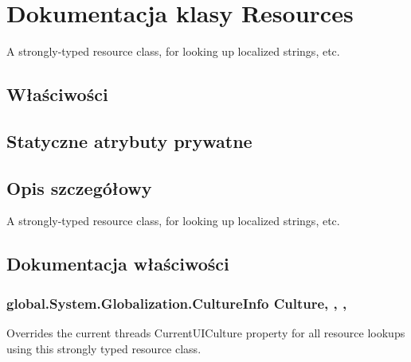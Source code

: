 \hypertarget{a00047}{}\section{Dokumentacja klasy Resources}
\label{a00047}


A strongly-\/typed resource class, for looking up localized strings, etc.  


\subsection*{Właściwości}
\subsection*{Statyczne atrybuty prywatne}


\subsection{Opis szczegółowy}
A strongly-\/typed resource class, for looking up localized strings, etc. 



\subsection{Dokumentacja właściwości}
\hypertarget{a00047_a97174a2d0af83f0bd014787ac18be56c}{}
\subsubsection[{Culture}]{\setlength{\rightskip}{0pt plus 5cm}global.\+System.\+Globalization.\+Culture\+Info Culture\hspace{0.3cm}{\ttfamily [static]}, {\ttfamily [get]}, {\ttfamily [set]}, {\ttfamily [package]}}\label{a00047_a97174a2d0af83f0bd014787ac18be56c}


Overrides the current thread\textquotesingle{}s Current\+U\+I\+Culture property for all resource lookups using this strongly typed resource class. 

\hypertarget{a00047_a142c14840c9a6d87d6bfa9f117309251}{}
